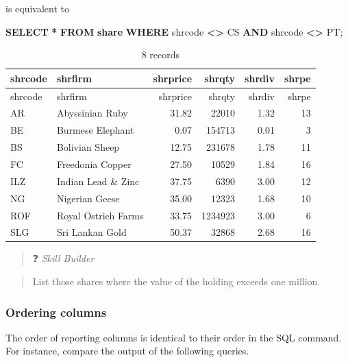 \documentclass[
]{article}
\newenvironment{Shaded}{\begin{snugshade}}{\end{snugshade}}
\newcommand{\KeywordTok}[1]{\textcolor[rgb]{0.13,0.29,0.53}{\textbf{#1}}}
\newcommand{\NormalTok}[1]{#1}
\newcommand{\OperatorTok}[1]{\textcolor[rgb]{0.81,0.36,0.00}{\textbf{#1}}}
\newcommand{\StringTok}[1]{\textcolor[rgb]{0.31,0.60,0.02}{#1}}
\begin{document}
is equivalent to

\begin{Shaded}
\begin{Highlighting}[]
\KeywordTok{SELECT} \OperatorTok{*} \KeywordTok{FROM} \KeywordTok{share} \KeywordTok{WHERE}\NormalTok{ shrcode }\OperatorTok{\textless{}\textgreater{}} \StringTok{\textquotesingle{}CS\textquotesingle{}} \KeywordTok{AND}\NormalTok{ shrcode }\OperatorTok{\textless{}\textgreater{}} \StringTok{\textquotesingle{}PT\textquotesingle{}}\NormalTok{;}
\end{Highlighting}
\end{Shaded}

\begin{longtable}[]{@{}llrrrr@{}}
\caption{8 records}\tabularnewline
\toprule()
shrcode & shrfirm & shrprice & shrqty & shrdiv & shrpe \\
\midrule()
\endfirsthead
\toprule()
shrcode & shrfirm & shrprice & shrqty & shrdiv & shrpe \\
\midrule()
\endhead
AR & Abyssinian Ruby & 31.82 & 22010 & 1.32 & 13 \\
BE & Burmese Elephant & 0.07 & 154713 & 0.01 & 3 \\
BS & Bolivian Sheep & 12.75 & 231678 & 1.78 & 11 \\
FC & Freedonia Copper & 27.50 & 10529 & 1.84 & 16 \\
ILZ & Indian Lead \& Zinc & 37.75 & 6390 & 3.00 & 12 \\
NG & Nigerian Geese & 35.00 & 12323 & 1.68 & 10 \\
ROF & Royal Ostrich Farms & 33.75 & 1234923 & 3.00 & 6 \\
SLG & Sri Lankan Gold & 50.37 & 32868 & 2.68 & 16 \\
\bottomrule()
\end{longtable}

\begin{quote}
❓ \emph{Skill Builder}
\end{quote}

\begin{quote}
List those shares where the value of the holding exceeds one million.
\end{quote}

\hypertarget{ordering-columns}{%
\subsubsection{Ordering columns}\label{ordering-columns}}

The order of reporting columns is identical to their order in the SQL
command. For instance, compare the output of the following queries.
\end{document}
